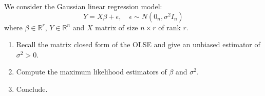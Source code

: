 \begin{exercise}
We consider the Gaussian linear regression model:
\[Y = X\beta + \epsilon, \quad \epsilon \sim N(0_n, \sigma^2 I_n)\]
where \(\beta \in \mathbb{R}^r\), \(Y \in \mathbb{R}^n\) and \(X\) matrix of size \(n \times r\) of rank \(r\).

\begin{enumerate}
    \item Recall the matrix closed form of the OLSE and give an unbiased estimator of \(\sigma^2 > 0\).
    \item Compute the maximum likelihood estimators of \(\beta\) and \(\sigma^2\).
    \item Conclude.
\end{enumerate}
\end{exercise}

